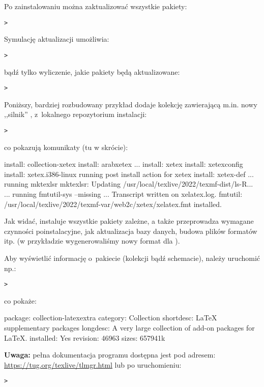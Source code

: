 \documentclass{article}
\begin{document}
Po zainstalowaniu \TL{} można zaktualizować wszystkie pakiety:
\begin{alltt}
> 
\end{alltt}
Symulację aktualizacji umożliwia:
\begin{alltt}
> 
\end{alltt}
bądź tylko wyliczenie, jakie pakiety będą aktualizowane:
\begin{alltt}
> 
\end{alltt}

Poniższy, bardziej rozbudowany przykład dodaje kolekcję zawierającą m.in. nowy ,,silnik'' \XeTeX,
 z~lokalnego repozytorium instalacji:

\begin{alltt}
> 
\end{alltt}
co pokazują komunikaty (tu w skrócie):
\begin{fverbatim}
install: collection-xetex
install: arabxetex
...
install: xetex
install: xetexconfig
install: xetex.i386-linux
running post install action for xetex
install: xetex-def
...
running mktexlsr
mktexlsr: Updating /usr/local/texlive/2022/texmf-dist/ls-R...
...
running fmtutil-sys --missing
...
Transcript written on xelatex.log.
fmtutil: /usr/local/texlive/2022/texmf-var/web2c/xetex/xelatex.fmt installed.
\end{fverbatim}

Jak widać,  instaluje wszystkie pakiety zależne, a także
przeprowadza wymagane czynności poinstalacyjne, jak aktualizacja bazy
danych, budowa plików formatów itp. (w przykładzie wygenerowaliśmy
nowy format dla \XeTeX).

Aby wyświetlić informację o~pakiecie (kolekcji bądź schemacie), należy
uruchomić np.:
\begin{alltt}
> 
\end{alltt}
co pokaże:
\begin{fverbatim}
package:    collection-latexextra
category:   Collection
shortdesc:  LaTeX supplementary packages
longdesc:   A very large collection of add-on packages for LaTeX.
installed:  Yes
revision:   46963
sizes:      657941k
\end{fverbatim}

\noindent
\textbf{Uwaga:} pełna dokumentacja programu  dostępna
jest pod adresem:
\url{https://tug.org/texlive/tlmgr.html} lub po uruchomieniu:
\begin{alltt}
> 
\end{alltt}
\end{document}
